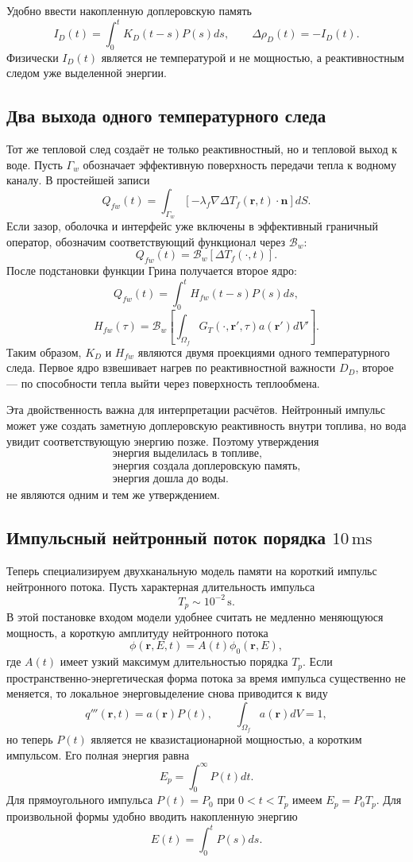 \documentclass[12pt]{article}
\begin{document}
Удобно ввести накопленную доплеровскую память
\[
I_D(t)=\int_0^tK_D(t-s)P(s)ds,
\qquad
\Delta\rho_D(t)=-I_D(t).
\]
Физически \(I_D(t)\) является не температурой и не мощностью, а реактивностным следом уже выделенной энергии.

\subsection{Два выхода одного температурного следа}

Тот же тепловой след создаёт не только реактивностный, но и тепловой выход к воде. Пусть \(\Gamma_w\) обозначает эффективную поверхность передачи тепла к водному каналу. В простейшей записи
\[
Q_{fw}(t)
=
\int_{\Gamma_w}
\left[-\lambda_f\nabla\Delta T_f(\mathbf r,t)\cdot\mathbf n\right]dS.
\]
Если зазор, оболочка и интерфейс уже включены в эффективный граничный оператор, обозначим соответствующий функционал через \(\mathcal B_w\):
\[
Q_{fw}(t)=\mathcal B_w[\Delta T_f(\cdot,t)].
\]
После подстановки функции Грина получается второе ядро:
\[
Q_{fw}(t)=\int_0^tH_{fw}(t-s)P(s)ds,
\]
\[
\boxed{
H_{fw}(\tau)
=
\mathcal B_w\left[
\int_{\Omega_f}G_T(\cdot,\mathbf r',\tau)a(\mathbf r')dV'
\right].
}
\]
Таким образом, \(K_D\) и \(H_{fw}\) являются двумя проекциями одного температурного следа. Первое ядро взвешивает нагрев по реактивностной важности \(D_D\), второе --- по способности тепла выйти через поверхность теплообмена.

Эта двойственность важна для интерпретации расчётов. Нейтронный импульс может уже создать заметную доплеровскую реактивность внутри топлива, но вода увидит соответствующую энергию позже. Поэтому утверждения
\[
\begin{gathered}
\text{энергия выделилась в топливе},\\
\text{энергия создала доплеровскую память},\\
\text{энергия дошла до воды}.
\end{gathered}
\]
не являются одним и тем же утверждением.

\subsection{Импульсный нейтронный поток порядка \(10\,\mathrm{ms}\)}
\label{subsec:pulse10ms}

Теперь специализируем двухканальную модель памяти на короткий импульс нейтронного потока. Пусть характерная длительность импульса
\[
T_p\sim 10^{-2}\,\mathrm{s}.
\]
В этой постановке входом модели удобнее считать не медленно меняющуюся мощность, а короткую амплитуду нейтронного потока
\[
\phi(\mathbf r,E,t)=A(t)\phi_0(\mathbf r,E),
\]
где \(A(t)\) имеет узкий максимум длительностью порядка \(T_p\). Если пространственно-энергетическая форма потока за время импульса существенно не меняется, то локальное энерговыделение снова приводится к виду
\[
q'''(\mathbf r,t)=a(\mathbf r)P(t),
\qquad
\int_{\Omega_f}a(\mathbf r)dV=1,
\]
но теперь \(P(t)\) является не квазистационарной мощностью, а коротким импульсом. Его полная энергия равна
\[
E_p=\int_0^{\infty}P(t)dt.
\]
Для прямоугольного импульса \(P(t)=P_0\) при \(0<t<T_p\) имеем \(E_p=P_0T_p\). Для произвольной формы удобно вводить накопленную энергию
\[
E(t)=\int_0^tP(s)ds.
\]
\end{document}
